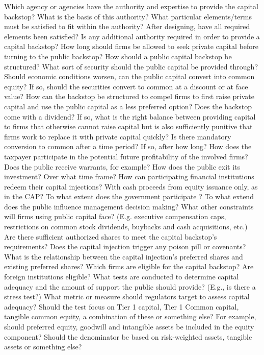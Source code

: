 \documentclass[12pt]{article}
\begin{document}
\begin{outline}[enumerate]
\1 Which agency or agencies have the authority and expertise to provide the capital backstop?
\2 What is the basis of this authority?
\2 What particular elements/terms must be satisfied to fit within the authority?
\2 After designing, have all required elements been satisfied?
\2 Is any additional authority required in order to provide a capital backstop?
\2 How long should firms be allowed to seek private capital before turning to the public backstop?
\1 How should a public capital backstop be structured?
\2 What sort of security should the public capital be provided through?
\2 Should economic conditions worsen, can the public capital convert into common equity?
\3 If so, should the securities convert to common at a discount or at face value?
\2 How can the backstop be structured to compel firms to first raise private capital and use the public capital as a less preferred option?
\2 Does the backstop come with a dividend? If so, what is the right balance between providing capital to firms that otherwise cannot raise capital but is also sufficiently punitive that firms work to replace it with private capital quickly?
\2 Is there mandatory conversion to common after a time period? If so, after how long?
\2 How does the taxpayer participate in the potential future profitability of the involved firms? Does the public receive warrants, for example?
\2 How does the public exit its investment? Over what time frame?
\2 How can participating financial institutions redeem their capital injections? With cash proceeds from equity issuance only, as in the CAP?
\1 To what extent does the government participate ?
\2 To what extend does the public influence management decision making?
\2 What other constraints will firms using public capital face? (E.g. executive compensation caps, restrictions on common stock dividends, buybacks and cash acquisitions, etc.)
\2 Are there sufficient authorized shares to meet the capital backstop's requirements?
\2 Does the capital injection trigger any poison pill or covenants?
\2 What is the relationship between the capital injection's preferred shares and existing preferred shares?
\1 Which firms are eligible for the capital backstop?
\2 Are foreign institutions eligible?
\2 What tests are conducted to determine capital adequacy and the amount of support the public should provide? (E.g., is there a stress test?)
\2 What metric or measure should regulators target to assess capital adequacy?
\3 Should the test focus on Tier 1 capital, Tier 1 Common capital, tangible common equity, a combination of these or something else?
\4 For example, should preferred equity, goodwill and intangible assets be included in the equity component?
\4 Should the denominator be based on risk-weighted assets, tangible assets or something else?

\end{outline}
\end{document}
